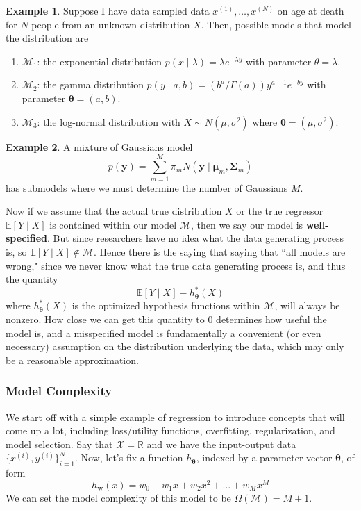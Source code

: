 \documentclass{article}
\theoremstyle{definition}
\newtheorem{example}{Example}[section]
\begin{document}
    \begin{example}
    Suppose I have data sampled data $x^{(1)}, \ldots, x^{(N)}$ on age at death for $N$ people from an unknown distribution $X$. Then, possible models that model the distribution are 
    \begin{enumerate}
        \item $\mathcal{M}_1$: the exponential distribution $p(x \mid \lambda) = \lambda e^{-\lambda y}$ with parameter $\theta = \lambda$. 
        \item $\mathcal{M}_2$: the gamma distribution $p(y \mid a, b) = (b^a / \Gamma(a)) y^{a - 1} e^{- by}$ with parameter $\boldsymbol{\theta} = (a, b)$. 
        \item $\mathcal{M}_3$: the log-normal distribution with $X \sim N (\mu, \sigma^2)$ where ${\boldsymbol{\theta}} = (\mu, \sigma^2)$. 
    \end{enumerate}
    \end{example}

    \begin{example}
    A mixture of Gaussians model 
    \[p(\mathbf{y}) = \sum_{m=1}^M \pi_m N(\mathbf{y} \mid \boldsymbol{\mu}_m, \boldsymbol{\Sigma}_m )\]
    has submodels where we must determine the number of Gaussians $M$. 
    \end{example}

    Now if we assume that the actual true distribution $X$ or the true regressor $\mathbb{E}[Y\mid X]$ is contained within our model $\mathcal{M}$, then we say our model is \textbf{well-specified}. But since researchers have no idea what the data generating process is, so $\mathbb{E}[Y\mid X] \not\in \mathcal{M}$. Hence there is the saying that saying that ``all models are wrong," since we never know what the true data generating process is, and thus the quantity 
    \[\mathbb{E}[Y \mid X] - h_{\boldsymbol{\theta}}^\ast (X)\]
    where $h_{\boldsymbol{\theta}}^\ast (X)$ is the optimized hypothesis functions within $\mathcal{M}$, will always be nonzero. How close we can get this quantity to $0$ determines how useful the model is, and a misspecified model is fundamentally a convenient (or even necessary) assumption on the distribution underlying the data, which may only be a reasonable approximation. 

    \subsubsection{Model Complexity}

    We start off with a simple example of regression to introduce concepts that will come up a lot, including loss/utility functions, overfitting, regularization, and model selection. Say that $\mathcal{X} = \mathbb{R}$ and we have the input-output data $\{x^{(i)}, y^{(i)}\}_{i=1}^N$. Now, let's fix a function $h_{\boldsymbol{\theta}}$, indexed by a parameter vector $\boldsymbol{\theta}$, of form 
    \[h_\mathbf{w} (x) = w_0 + w_1 x + w_2 x^2 + \ldots + w_M x^M\]
    We can set the model complexity of this model to be $\Omega(\mathcal{M}) = M + 1$. 
\end{document}
